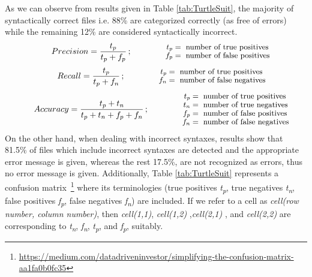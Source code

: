 As we can observe from results given in Table \ref{tab:TurtleSuit}, the majority of syntactically correct files i.e. 88\% are categorized correctly (as free of errors) while the remaining 12\% are considered syntactically incorrect.
\begin{align} 
   Precision=  \frac{t_p}{t_p+f_p}\,;\qquad
\qquad\parbox{4.0cm}{\footnotesize$\begin{aligned} t_p &= \text{ number of true positives}\\[-1.0ex] f_p &= \text{ number of false positives}\end{aligned}$}
   \label{eq:1}
\end{align}
\begin{align}
   Recall =  \frac{t_p}{t_p+f_n} \,;\qquad
\qquad\parbox{4.0cm}{\footnotesize$\begin{aligned} t_p &= \text{ number of true positives}\\[-1.0ex] f_n &= \text{ number of false negatives}\end{aligned}$}
   \label{eq:2}
\end{align}
\begin{align}
   Accuracy =  \frac{t_p+t_n}{t_p+t_n+f_p+f_n} \,;\qquad
\qquad\parbox{4.0cm}{\footnotesize$\begin{aligned} t_p &= \text{ number of true positives}\\[-1.0ex]
t_n &= \text{ number of true negatives}\\[-1.0ex]
f_p &= \text{ number of false positives}\\[-1.0ex]
f_n &= \text{ number of false negatives}\end{aligned}$}
   \label{eq:3}
\end{align}
On the other hand, when dealing with incorrect syntaxes, results show that 81.5\% of files which include incorrect syntaxes are detected and the appropriate error message is given, whereas the rest 17.5\%, are not recognized as errors, thus no error message is given. Additionally, Table \ref{tab:TurtleSuit}  represents a confusion matrix~\footnote{\url{https://medium.com/datadriveninvestor/simplifying-the-confusion-matrix-aa1fa0b0fc35}} where its terminologies (true positives \textit{t\textsubscript{p}}, true negatives \textit{t\textsubscript{n}},
false positives \textit{f\textsubscript{p}},
false negatives \textit{f\textsubscript{n}}) are included. If we refer to a cell as \emph{cell(row number, column number)}, then \emph{cell(1,1)}, \emph{cell(1,2)}  ,\emph{cell(2,1)} , and \emph{cell(2,2)} are corresponding to \textit{t\textsubscript{n}}, 
\textit{f\textsubscript{n}}, 
\textit{t\textsubscript{p}}, 
and \textit{f\textsubscript{p}},
suitably.

